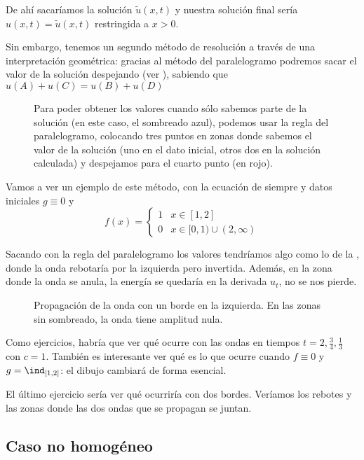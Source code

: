 		De ahí sacaríamos la solución $\tilde{u}(x,t)$ y nuestra solución final sería $u(x,t) = \tilde{u}(x,t)$ restringida a $x > 0$.

		Sin embargo, tenemos un segundo método de resolución a través de una interpretación geométrica: gracias al método del paralelogramo podremos sacar el valor de la solución despejando (ver ), sabiendo que \( u(A) + u(C) = u(B) + u(D) \label{eq:Onda:Paralelogramo} \)

		\begin{figure}[hbtp]
		\caption{Para poder obtener los valores cuando sólo sabemos parte de la solución (en este caso, el sombreado azul), podemos usar la regla del paralelogramo, colocando tres puntos en zonas donde sabemos el valor de la solución (uno en el dato inicial, otros dos en la solución calculada) y despejamos para el cuarto punto (en rojo).}
		\label{fig:AplicacionParalelogramo}
		\end{figure}

		Vamos a ver un ejemplo de este método, con la ecuación de siempre y datos iniciales $g \equiv 0$ y \[ f(x) = \begin{cases} 1 & x ∈ [1,2] \\ 0 & x ∈ [0,1) ∪ (2,∞) \end{cases} \]

		Sacando con la regla del paralelogramo los valores tendríamos algo como lo de la , donde la onda rebotaría por la izquierda pero invertida. Además, en la zona donde la onda se anula, la energía se quedaría en la derivada $u_t$, no se nos pierde.

		\begin{figure}[hbtp]
		\centering
		\caption{Propagación de la onda con un borde en la izquierda. En las zonas sin sombreado, la onda tiene amplitud nula.}
		\label{fig:OndaReflexion}
		\end{figure}


		Como ejercicios, habría que ver qué ocurre con las ondas en tiempos $t = 2, \frac{3}{4}, \frac{1}{3}$ con $c = 1$. También es interesante ver qué es lo que ocurre cuando $f \equiv 0$ y $g = \ind_{[1,2]}$: el dibujo cambiará de forma esencial.

		El último ejercicio sería ver qué ocurriría con dos bordes. Veríamos los rebotes y las zonas donde las dos ondas que se propagan se juntan.

		\subsection{Caso no homogéneo}

